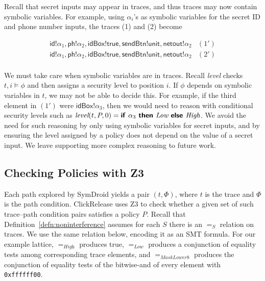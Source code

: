 \documentclass{llncs}
\newcommand{\code}[1]{\textsf{#1}} %
\newcommand{\bcode}[1]{\texttt{#1}}
\newcommand{\toolname}{ClickRelease\xspace}
\newcommand{\tr}{t\xspace}
\newcommand{\tlevel}[3]{\textit{level}(#1, #2, #3)}
\begin{document}
Recall that secret inputs may appear in traces, and thus traces may
now contain symbolic variables. For example, using $\alpha_i$'s as
symbolic variables for the secret ID and phone number inputs, the
traces (1) and (2) become

\begin{displaymath}
  \begin{array}{cl}
    \code{id}!\alpha_1, \code{ph}!\alpha_2, \code{idBox}!\code{true},
    \code{sendBtn}!\code{unit}, \code{netout}!\alpha_2 & (1') \\
    \code{id}!\alpha_1, \code{ph}!\alpha_2, \code{idBox}!\code{true},
    \code{sendBtn}!\code{unit}, \code{netout}!\alpha_2 & (2') \\
  \end{array}
\end{displaymath}

We must take care when symbolic variables are in traces.
Recall \textit{level} checks $t,i \models \phi$ and
then assigns a security level to position $i$. If $\phi$
depends on symbolic variables in $t$, we may not be able to
decide this. For example, if the third element in $(1')$ were
$\code{idBox}!\alpha_3$, then we would need to reason with
conditional security levels such as
$\tlevel{\tr}{P}{0} =\textsf{\textbf{if }} \alpha_3 \textsf{\textbf{ then }} \textit{Low}
\textsf{\textbf{ else }} \textit{High}$. We
avoid the need for such reasoning by only using symbolic variables for
secret inputs, and by ensuring the level assigned by a policy does not
depend on the value of a secret input. We leave supporting more complex
reasoning to future work.

\subsection{Checking Policies with Z3}

Each path explored by SymDroid yields a pair $(t, \Phi)$, where $t$ is
the trace and $\Phi$ is the path condition. \toolname{} uses Z3 to check whether a given set
of such trace--path condition pairs satisfies a policy $P$. Recall that
Definition~\ref{defn:noninterference} assumes for each $S$ there is an
$=_S$ relation on traces. We use the same relation below, encoding it
as an SMT formula. For our example lattice, $=_\textit{High}$ produces
\code{true}, $=_\textit{Low}$ produces a conjunction of equality tests
among corresponding trace elements, and $=_\textit{MaskLower8}$
produces the conjunction of equality tests of the bitwise-and of every
element with \bcode{0xffffff00}.
\end{document}
